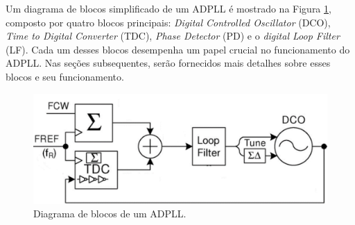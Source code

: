 Um diagrama de blocos simplificado de um ADPLL é mostrado na Figura \ref{fig:adpll_block_diagram}, composto por quatro blocos principais:  \textit{Digital Controlled Oscillator} (DCO), \textit{Time to Digital Converter} (TDC), \textit{Phase Detector} (PD) e o \textit{ digital Loop Filter} (LF). Cada um desses blocos desempenha um papel crucial no funcionamento do ADPLL. Nas seções subsequentes, serão fornecidos mais detalhes sobre esses blocos e seu funcionamento.

%
%

\begin{figure}[h!]
	\caption{Diagrama de blocos de um ADPLL.}
	\begin{center}
		\includegraphics[scale=0.6]{img/adpll_block_diagram.png}
	\end{center}
	\label{fig:adpll_block_diagram}
\end{figure}


